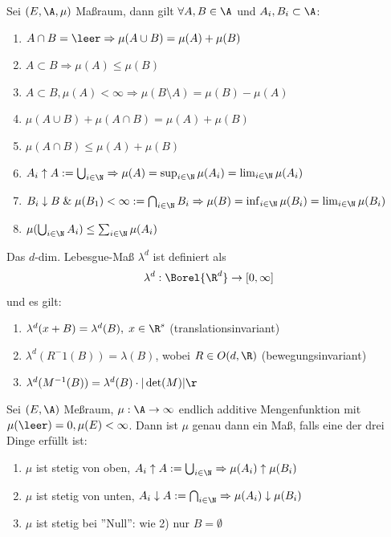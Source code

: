 \documentclass[11pt, a4paper]{article}
\begin{document}
\begin{theorem} \Theorem
    Sei $(E,\A,\mu)$ Maßraum, dann gilt $\forall A,B\in \A$ und $A_i, B_i \subset \A$:

    \begin{enumerate}
        \item $A\cap B = \leer \Rightarrow \mu(A \cup B) = \mu(A)+\mu(B)$
        \item $A\subset B \Rightarrow \mu(A)\leq \mu(B)$
        \item $A\subset B, \mu(A)< \infty \Rightarrow \mu(B\setminus A) = \mu(B)-\mu(A)$
        \item $\mu(A\cup B) + \mu(A\cap B) = \mu(A) +\mu(B)$
        \item $\mu(A\cap B) \leq \mu(A)+\mu(B)$
        \item $A_i \uparrow A:= \bigcup_{i\in\N} \Rightarrow \mu(A) = \sup_{i\in \N} \mu(A_i) = \lim_{i\in \N} \mu(A_i)$
        \item $B_i \downarrow B \; \& \; \mu(B_1) <\infty:= \bigcap_{i\in \N} B_i \Rightarrow \mu(B) = \inf_{i\in \N}\mu(B_i) =\lim_{i\in \N}   \mu(B_i) $
        \item $\mu(\bigcup_{i\in \N} A_i) \leq \sum_{i\in\N} \mu(A_i)$
    \end{enumerate}
\end{theorem}

\begin{definition}
    Das $d$-dim. Lebesgue-Maß $\lambda^d$ ist definiert als
    $$\lambda^d: \Borel{\R^d} \to [0,\infty]$$
    und es gilt:
    \begin{enumerate}
        \item $\lambda^d(x+B) = \lambda^d(B), \; x\in \R^s$ (translationsinvariant)
        \item $\lambda^d(R^-1(B)) = \lambda(B)$, wobei $R\in O(d,\R)$ (bewegungsinvariant)
        \item $\lambda^d(M^{-1}(B))= \lambda^d(B) \cdot |\det(M)|\r$
    \end{enumerate}
\end{definition}

\begin{lemma}
    Sei $(E,\A)$ Meßraum, $\mu: \A \to \infty$ endlich additive Mengenfunktion mit $\mu(\leer) = 0, \mu(E)<\infty$. Dann ist $\mu$ genau dann ein Maß, falls eine der drei Dinge erfüllt ist:

\begin{enumerate}
    \item $\mu$ ist stetig von oben, $A_i \uparrow A:= \bigcup_{i\in\N} \Rightarrow \mu(A_i)\uparrow \mu(B_i)$
    \item $\mu$ ist stetig von unten, $A_i \downarrow A:= \bigcap_{i\in\N} \Rightarrow \mu(A_i)\downarrow \mu(B_i)$
    \item $\mu$ ist stetig bei ''Null'': wie 2) nur $B= \emptyset$
\end{enumerate}
\end{lemma}
\end{document}
